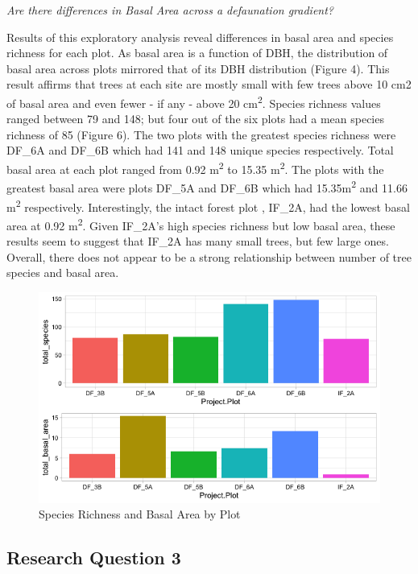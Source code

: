\documentclass[
  12pt,
]{article}
\begin{document}
\emph{Are there differences in Basal Area across a defaunation
gradient?}

Results of this exploratory analysis reveal differences in basal area
and species richness for each plot. As basal area is a function of DBH,
the distribution of basal area across plots mirrored that of its DBH
distribution (Figure 4). This result affirms that trees at each site are
mostly small with few trees above 10 cm2 of basal area and even fewer -
if any - above 20 cm\textsuperscript{2}. Species richness values ranged
between 79 and 148; but four out of the six plots had a mean species
richness of 85 (Figure 6). The two plots with the greatest species
richness were DF\_6A and DF\_6B which had 141 and 148 unique species
respectively. Total basal area at each plot ranged from 0.92
m\textsuperscript{2} to 15.35 m\textsuperscript{2}. The plots with the
greatest basal area were plots DF\_5A and DF\_6B which had
15.35m\textsuperscript{2} and 11.66 m\textsuperscript{2} respectively.
Interestingly, the intact forest plot , IF\_2A, had the lowest basal
area at 0.92 m\textsuperscript{2}. Given IF\_2A's high species richness
but low basal area, these results seem to suggest that IF\_2A has many
small trees, but few large ones. Overall, there does not appear to be a
strong relationship between number of tree species and basal area.

\begin{figure}
\includegraphics[width=0.95\linewidth]{./GoldenGriffithsKnierMalinowski_ENV872_Project_files/figure6} \caption{Species Richness and Basal Area by Plot}\label{fig:unnamed-chunk-9}
\end{figure}

\hypertarget{research-question-3-1}{%
\subsection{Research Question 3}\label{research-question-3-1}}
\end{document}
